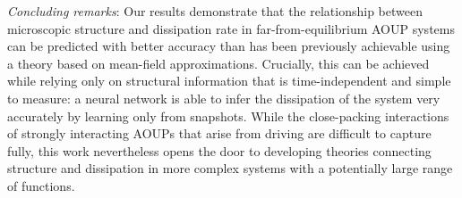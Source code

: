 \documentclass[superscriptaddress, twocolumn, prl, longbibliography, nofootinbib]{revtex4-1}
\begin{document}
{\it Concluding remarks}: Our results demonstrate that the relationship between microscopic structure and dissipation rate in far-from-equilibrium AOUP systems can be predicted with better accuracy than has been previously achievable using a theory based on mean-field approximations. Crucially, this can be achieved while relying only on structural information that is time-independent and simple to measure: a neural network is able to infer the dissipation of the system very accurately by learning only from snapshots. While the close-packing interactions of strongly interacting AOUPs that arise from driving are difficult to capture fully, this work nevertheless opens the door to developing theories connecting structure and dissipation in more complex systems with a potentially large range of functions.






\end{document}
